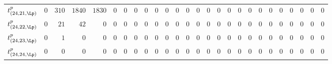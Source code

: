 \begin{tabular}{r|rrrrrrrrrrrrrrrrrrrrrrrrr}
  $t^{p}_{(24,21,\Lp)}$ & $0$ & $310$ & $1840$ & $1830$ & $0$ & $0$ & $0$ & $0$ & $0$ & $0$ & $0$ & $0$ & $0$ & $0$ & $0$ & $0$ & $0$ & $0$ & $0$ & $0$ & $0$ & $0$ & $0$ & $0$ & $0$ \\
  $t^{p}_{(24,22,\Lp)}$ & $0$ & $21$ & $42$ & $0$ & $0$ & $0$ & $0$ & $0$ & $0$ & $0$ & $0$ & $0$ & $0$ & $0$ & $0$ & $0$ & $0$ & $0$ & $0$ & $0$ & $0$ & $0$ & $0$ & $0$ & $0$ \\
  $t^{p}_{(24,23,\Lp)}$ & $0$ & $1$ & $0$ & $0$ & $0$ & $0$ & $0$ & $0$ & $0$ & $0$ & $0$ & $0$ & $0$ & $0$ & $0$ & $0$ & $0$ & $0$ & $0$ & $0$ & $0$ & $0$ & $0$ & $0$ & $0$ \\
  $t^{p}_{(24,24,\Lp)}$ & $0$ & $0$ & $0$ & $0$ & $0$ & $0$ & $0$ & $0$ & $0$ & $0$ & $0$ & $0$ & $0$ & $0$ & $0$ & $0$ & $0$ & $0$ & $0$ & $0$ & $0$ & $0$ & $0$ & $0$ & $0$ \\
\end{tabular}
